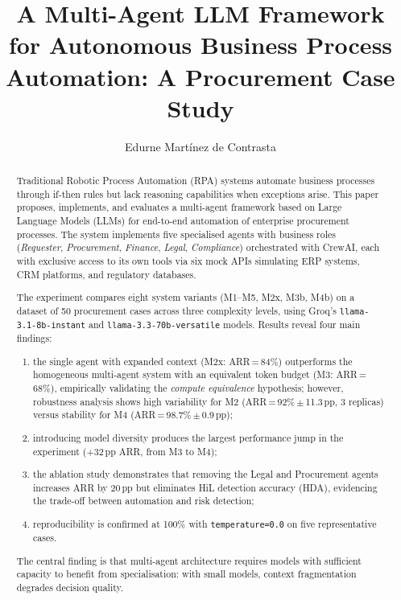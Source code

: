 \documentclass[preprint,12pt,authoryear]{elsarticle}
\begin{document}
\begin{frontmatter}

\title{A Multi-Agent LLM Framework for Autonomous Business Process Automation:
       A Procurement Case Study}

\author[uax,proj]{Edurne Martínez de Contrasta}

\address[uax]{Máster en Big Data y Business Analytics,
              Universidad Alfonso X el Sabio, Madrid, Spain}

\address[proj]{PROJENER.AI SL, Madrid, Spain}

\begin{abstract}
Traditional Robotic Process Automation (RPA) systems automate business processes
through if-then rules but lack reasoning capabilities when exceptions arise.
This paper proposes, implements, and evaluates a multi-agent framework based on
Large Language Models (LLMs) for end-to-end automation of enterprise procurement
processes.
The system implements five specialised agents with business roles
(\emph{Requester}, \emph{Procurement}, \emph{Finance}, \emph{Legal},
\emph{Compliance}) orchestrated with CrewAI, each with exclusive access to its
own tools via six mock APIs simulating ERP systems, CRM platforms, and
regulatory databases.

The experiment compares eight system variants (M1--M5, M2x, M3b, M4b) on a
dataset of 50 procurement cases across three complexity levels, using Groq's
\texttt{llama-3.1-8b-instant} and \texttt{llama-3.3-70b-versatile} models.
Results reveal four main findings:
\begin{enumerate}[label=(\arabic*)]
  \item the single agent with expanded context (M2x: ARR\,=\,84\%) outperforms
        the homogeneous multi-agent system with an equivalent token budget
        (M3: ARR\,=\,68\%), empirically validating the \emph{compute
        equivalence} hypothesis; however, robustness analysis shows high
        variability for M2 (ARR\,=\,92\%\,$\pm$\,11.3\,pp, 3 replicas)
        versus stability for M4 (ARR\,=\,98.7\%\,$\pm$\,0.9\,pp);
  \item introducing model diversity produces the largest performance jump in
        the experiment (+32\,pp ARR, from M3 to M4);
  \item the ablation study demonstrates that removing the Legal and Procurement
        agents increases ARR by 20\,pp but eliminates HiL detection accuracy
        (HDA), evidencing the trade-off between automation and risk detection;
  \item reproducibility is confirmed at 100\% with \texttt{temperature=0.0}
        on five representative cases.
\end{enumerate}
The central finding is that multi-agent architecture requires models with
sufficient capacity to benefit from specialisation: with small models, context
fragmentation degrades decision quality.
\end{abstract}


\end{frontmatter}
\end{document}
